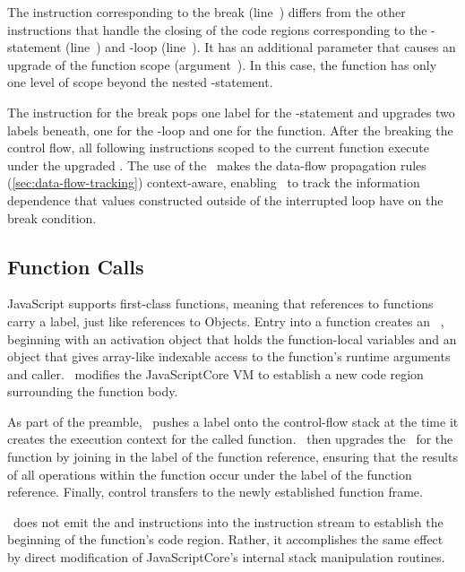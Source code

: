 The \popj instruction corresponding to the break (line~) differs from the other \popj instructions that handle the closing of the code regions corresponding to the -statement (line~) and -loop (line~).
It has an additional parameter that causes an upgrade of the function scope (argument~).
In this case, the function has only one level of scope beyond the nested -statement.

The \popj instruction for the break pops one label for the -statement and upgrades two labels beneath, one for the -loop and one for the function.
After the breaking the control flow, all following instructions scoped to the current function execute under the upgraded \pclabel.
The use of the \pclabel\ makes the data-flow propagation rules (\autoref{sec:data-flow-tracking}) context-aware, enabling \FlowCore\ to track the information dependence that values constructed outside of the interrupted loop have on the break condition.

\subsection{Function Calls}
\label{sec:function-calls}

JavaScript supports first-class functions, meaning that references to functions carry a label, just like references to Objects.
Entry into a function creates an ~\cite{ecma}, beginning with an activation object that holds the function-local variables and an  object that gives array-like indexable access to the function's runtime arguments and caller.
\FlowCore\ modifies the JavaScriptCore VM to establish a new code region surrounding the function body.

As part of the preamble, \FlowCore\ pushes a label onto the control-flow stack at the time it creates the execution context for the called function.
\FlowCore\ then upgrades the \pclabel\ for the function by joining in the label of the function reference, ensuring that the results of all operations within the function occur under the label of the function reference.
Finally, control transfers to the newly established function frame.

\FlowCore\ does not emit the \dup and \join instructions into the instruction stream to establish the beginning of the function's code region.
Rather, it accomplishes the same effect by direct modification of JavaScriptCore's internal stack manipulation routines.

